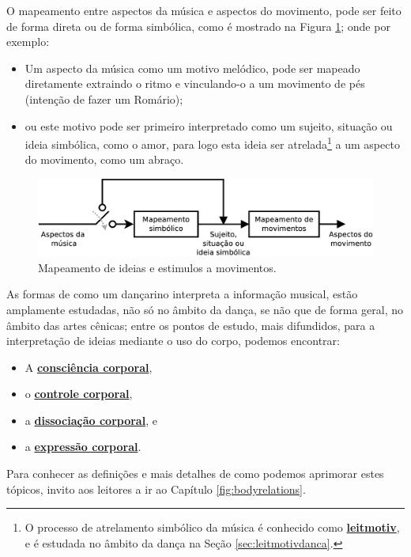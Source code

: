 O mapeamento entre aspectos da música e aspectos do movimento,
pode ser feito de forma direta ou de forma simbólica, como é mostrado na Figura \ref{fig:mapeamento};
onde por exemplo:
\begin{itemize}
\item Um aspecto da música como um motivo melódico, 
pode ser mapeado diretamente extraindo o ritmo e vinculando-o a um movimento de pés (intenção de fazer um Romário);
\item ou este motivo pode ser primeiro interpretado como um sujeito, situação ou ideia simbólica,
como o amor, para logo esta ideia ser atrelada\footnote{O 
processo de atrelamento simbólico da música é conhecido como \hyperref[sec:leitmotivdanca]{\textbf{leitmotiv}}, 
e é estudada no âmbito da dança na Seção \ref{sec:leitmotivdanca}.} a um aspecto do movimento, como um abraço.  
\end{itemize}

\begin{figure}[!h]
  \centering
    \includegraphics[width=1.00\textwidth]{chapters/cap-musicalidade/mapeamento.eps}
\caption{Mapeamento de ideias e estimulos a movimentos.}
\label{fig:mapeamento}
\end{figure}


As formas de como um dançarino interpreta a informação musical, 
estão amplamente estudadas, não só no âmbito da dança, 
se não que de forma geral, no âmbito das artes cênicas;
entre os pontos de estudo, mais difundidos, 
para a interpretação de ideias  mediante o uso do corpo, podemos encontrar:
\begin{itemize}
\item A \hyperref[sec:BodyAwareness]{\textbf{consciência corporal}},
\item o \hyperref[sec:BodyControl]{\textbf{controle corporal}},
\item a \hyperref[sec:BodyIsolation]{\textbf{dissociação corporal}}, e
\item a \hyperref[sec:BodyExpression]{\textbf{expressão corporal}}.
\end{itemize}
Para conhecer as definições e mais detalhes de como podemos aprimorar estes tópicos,
invito aos leitores a ir ao Capítulo \ref{fig:bodyrelations}.

